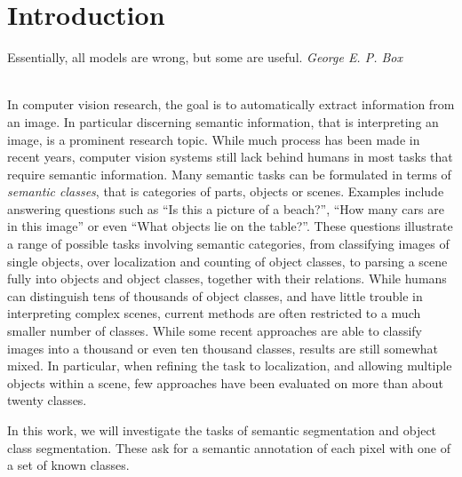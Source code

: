 \chapter{Introduction}
\vspace{1cm}
\hfill%
\begin{minipage}{.4\linewidth}
Essentially, all models are wrong, but some are useful. 
\flushright%
\emph{George E. P. Box}

\end{minipage}%
\\[2cm]
In computer vision research, the goal is to automatically extract information from an image.
In particular discerning semantic information, that is interpreting an image, is a prominent
research topic.
While much process has been made in recent years, computer vision systems still lack behind
humans in most tasks that require semantic information. Many semantic tasks can be formulated
in terms of \emph{semantic classes}, that is categories of parts, objects or scenes.
Examples include answering questions such as ``Is this a picture of a beach?'', ``How many
cars are in this image'' or even ``What objects lie on the table?''.
These questions illustrate a range of possible tasks involving semantic categories,
from classifying images of single objects, over localization and counting of object classes,
to parsing a scene fully into objects and object classes, together with their relations.
%
While humans can distinguish tens of thousands of object classes, and have little trouble
in interpreting complex scenes, current methods are often restricted to a much smaller number
of classes. While some recent approaches are able to classify images into a thousand 
or even ten thousand classes, results are still somewhat mixed.
In particular, when refining the task to localization, and allowing multiple objects within
a scene, few approaches have been evaluated on more than about twenty classes.

In this work, we will investigate the tasks of semantic segmentation and object
class segmentation.  These ask for a semantic annotation of each pixel with one
of a set of known classes.


